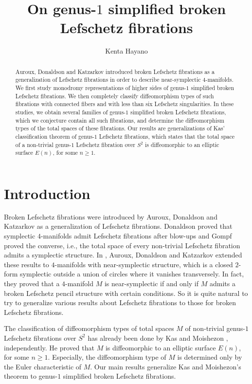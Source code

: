 \documentclass{amsart}
\title{On genus-$1$ simplified broken Lefschetz fibrations}
\author{Kenta Hayano}
\theoremstyle{plain}
\theoremstyle{definition}
\begin{document}
\begin{abstract}

Auroux, Donaldson and Katzarkov introduced broken Lefschetz fibrations as a generalization of Lefschetz fibrations in order to describe near-symplectic $4$-manifolds. 
We first study monodromy representations of higher sides of genus-$1$ simplified broken Lefschetz fibrations. 
We then completely classify diffeomorphism types of such fibrations with connected fibers and with less than six Lefschetz singularities. 
In these studies, we obtain several families of genus-$1$ simplified broken Lefschetz fibrations, which we conjecture contain all such fibrations, 
and determine the diffeomorphism types of the total spaces of these fibrations. 
Our results are generalizations of Kas' classification theorem of genus-$1$ Lefschetz fibrations, 
which states that the total space of a non-trivial genus-$1$ Lefschetz fibration over $S^2$ is diffeomorphic to an elliptic surface $E(n)$, for some $n\geq 1$. 

\end{abstract}

\maketitle

\section{Introduction}

Broken Lefschetz fibrations were introduced by Auroux, Donaldson and Katzarkov \cite{ADK} as a generalization of Lefschetz fibrations. 
Donaldson \cite{Don} proved that symplectic $4$-manifolds admit Lefschetz fibrations after blow-ups and Gompf \cite{Gompf} proved the converse, 
i.e., the total space of every non-trivial Lefschetz fibration admits a symplectic structure. 
In \cite{ADK}, Auroux, Donaldson and Katzarkov extended these results to $4$-manifolds with near-symplectic structure, 
which is a closed $2$-form symplectic outside a union of circles where it vanishes transversely. 
In fact, they proved that a $4$-manifold $M$ is near-symplectic if and only if $M$ admits a broken Lefschetz pencil structure with certain conditions. 
So it is quite natural to try to generalize various results about Lefschetz fibrations to those for broken Lefschetz fibrations. 

\par

The classification of diffeomorphism types of total spaces $M$ of non-trivial genus-$1$ Lefschetz fibrations over $S^2$ has already been done by Kas \cite{Kas} and Moishezon \cite{Moish}, independently. 
He proved that $M$ is diffeomorphic to an elliptic surface $E(n)$, for some $n\geq 1$. 
Especially, the diffeomorphism type of $M$ is determined only by the Euler characteristic of $M$. 
Our main results generalize Kas and Moishezon's theorem to genus-$1$ simplified broken Lefschetz fibrations. 
\end{document}
